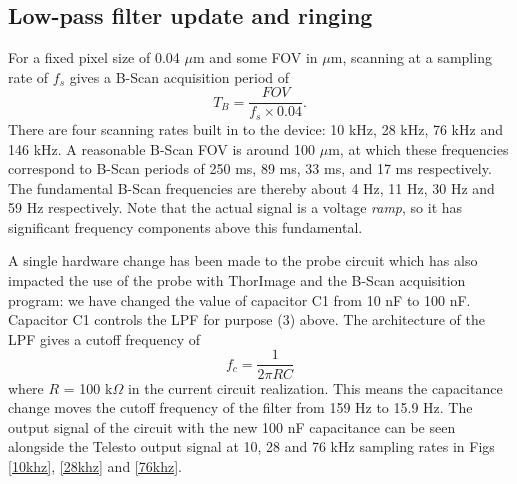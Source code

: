 \documentclass{article}
\begin{document}
\subsection{Low-pass filter update and ringing}

\par{For a fixed pixel size of 0.04 $\mu$m and some FOV in $\mu$m, scanning at a sampling rate of $f_s$ gives a B-Scan acquisition period of 
	\begin{equation}
		T_B = \frac{FOV}{f_s \times 0.04}.
	\end{equation}
There are four scanning rates built in to the device: 10 kHz, 28 kHz, 76 kHz and 146 kHz. A reasonable B-Scan FOV is around 100 $\mu$m, at which these frequencies correspond to B-Scan periods of 250 ms, 89 ms, 33 ms, and 17 ms respectively. The fundamental B-Scan frequencies are thereby about 4 Hz, 11 Hz, 30 Hz and 59 Hz respectively. Note that the actual signal is a voltage \textit{ramp}, so it has significant frequency components above this fundamental.}

\par{A single hardware change has been made to the probe circuit which has also impacted the use of the probe with ThorImage and the B-Scan acquisition program: we have changed the value of capacitor C1 from 10 nF to 100 nF. Capacitor C1 controls the LPF for purpose (3) above. The architecture of the LPF gives a cutoff frequency of 
	\begin{equation}
		f_c = \frac{1}{2\pi RC}
	\end{equation}
where $R$ = 100 k$\Omega$ in the current circuit realization. This means the capacitance change moves the cutoff frequency of the filter from 159 Hz to 15.9 Hz. The output signal of the circuit with the new 100 nF capacitance can be seen alongside the Telesto output signal at 10, 28 and 76 kHz sampling rates in Figs \ref{10khz}, \ref{28khz} and \ref{76khz}.}
\end{document}
